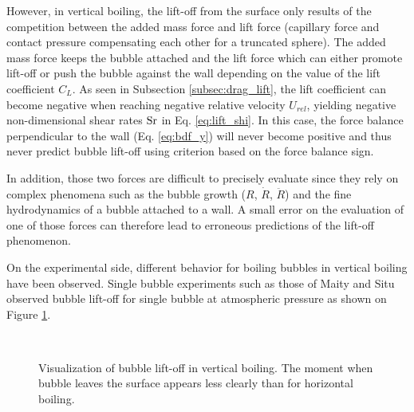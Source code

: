 \npar

However, in vertical boiling, the lift-off from the surface only results of the competition between the added mass force and lift force (capillary force and contact pressure compensating each other for a truncated sphere). The added mass force keeps the bubble attached and the lift force which can either promote lift-off or push the bubble against the wall depending on the value of the lift coefficient $C_{L}$. As seen in Subsection \ref{subsec:drag_lift}, the lift coefficient can become negative when reaching negative relative velocity $U_{rel}$, yielding negative non-dimensional shear rates $\mathrm{Sr}$ in Eq. \ref{eq:lift_shi}. In this case, the force balance perpendicular to the wall (Eq. \ref{eq:bdf_y}) will never become positive and thus never predict bubble lift-off using criterion based on the force balance sign.

In addition, those two forces are difficult to precisely evaluate since they rely on complex phenomena such as the bubble growth ($R$, $\dot{R}$, $\ddot{R}$) and the fine hydrodynamics of a bubble attached to a wall. A small error on the evaluation of one of those forces can therefore lead to erroneous predictions of the lift-off phenomenon.

\npar

On the experimental side, different behavior for boiling bubbles in vertical boiling have been observed. Single bubble experiments such as those of Maity \cite{maity_effect_2000} and Situ \etal \cite{situ_bubble_2005} observed bubble lift-off for single bubble at atmospheric pressure as shown on Figure \ref{fig:exp_lift}.


\begin{figure}[h!]
\begin{center}
\\
\end{center}
\caption{Visualization of bubble lift-off in vertical boiling. The moment when bubble leaves the surface appears less clearly than for horizontal boiling.} 
\label{fig:exp_lift}
\end{figure}

